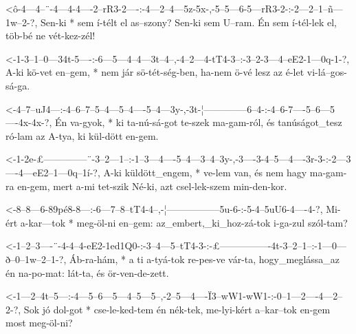   {<ô-4---4--¨-4---4-4----2--rR3-2----:-4---2--4---5z-5x-,-5--5---6-5---rR3-2-:-2---2--1--ñ---1w--2-?,}
  {   Sen-ki * sem í-télt el as--szony? Sen-ki sem U--ram. Én sem í-tél-lek el, töb-bé ne vét-kez-zél!}



  {<-1-3--1--0---34t-5----:-6---5---4--4---3t--4--,-4--2---4-tT4-3--:-3--2-3---4--eE2-1---0q-1-?,}
  {  A-ki kö-vet en--gem, * nem jár sö-tét-ség-ben, ha-nem ö-vé  lesz az é-let vi-lá--gos-sá-ga.}


  {<-4--7--uJ4---:-4--6--7--5--4---5--4----5--4---3y-,-3t-¦--------------6--4-:-4--6-7----5--6---5----4x-4x-?,}
  {  Én va-gyok, * ki ta-nú-sá-got te-szek ma-gam-ról, és tanúságot_tesz ró-lam az A-tya, ki kül-dött en-gem.}



  {<-1-2e-£--------------¨-3--2---1--:-1--3---4----5--4---3--4--3y-,-3----3-4--5---4----3r-3-:-2---3----4---eE2--1---0q--1í-?,}
  {  A-ki küldött_engem, * ve-lem van, és nem hagy ma-gam-ra en-gem, mert a-mi tet-szik Né-ki, azt csel-lek-szem min-den-kor.}



  {<-8--8---6-89pé8-8---:-6---7--8--tT4-4--,-¦-----------------5u-6-:-5-4--5uU6-4----4-?,}
  {  Mi-ért a-kar---tok * meg-öl-ni en--gem: az_embert,_ki_hoz-zá-tok i-ga-zul  szól-tam?}



  {<-1--2--3----¨-4-4--4-eE2-1ed1Q0-:-3--4---5--tT4-3-:-£----------------4t-3--2--1--:-1---0---ð--0--1w--2--1-?,}
  {  Áb-ra-hám, * a ti a-tyá-tok      re-pes-ve vár-ta, hogy_meglássa_az én na-po-mat: lát-ta, és ör-ven-de-zett.}



  {<-1---2--4t--5---:-4---5--6---5---4--5---5--,-2--5---4----Ï3--wW1-wW1-:-0--1---2----4---2--2-?,}
  {  Sok jó dol-got * cse-le-ked-tem én nék-tek, me-lyi-kért a--kar--tok   en-gem most meg-öl-ni?}

